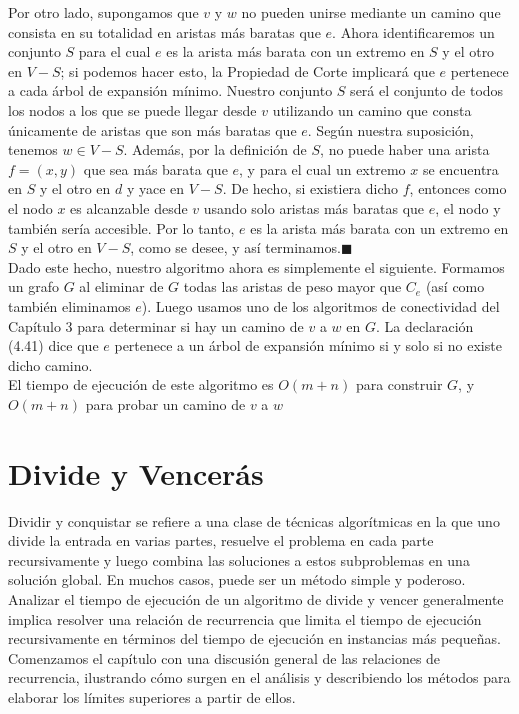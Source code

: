 \documentclass[a4paper, 12pt]{book}
\theoremstyle{dotless}
\begin{document}
Por otro lado, supongamos que $v$ y $w$ no pueden unirse mediante un camino que consista en su totalidad en aristas más baratas que $e$. Ahora identificaremos un conjunto $S$ para el cual $e$ es la arista más barata con un extremo en $S$ y el otro en $V-S$; si podemos hacer esto, la Propiedad de Corte implicará que $e$ pertenece a cada árbol de expansión mínimo. Nuestro conjunto $S$ será el conjunto de todos los nodos a los que se puede llegar desde $v$ utilizando un camino que consta únicamente de aristas que son más baratas que $e$. Según nuestra suposición, tenemos $w \in V-S$. Además, por la definición de $S$, no puede haber una arista $f=(x,y)$ que sea más barata que $e$, y para el cual un extremo $x$ se encuentra en $S$ y el otro en $d$ y yace en $V-S$. De hecho, si existiera dicho $f$, entonces como el nodo $x$ es alcanzable desde $v$ usando solo aristas más baratas que $e$, el nodo y también sería accesible. Por lo tanto, $e$ es la arista más barata con un extremo en $S$ y el otro en $V-S$, como se desee, y así terminamos.$\blacksquare$\\

Dado este hecho, nuestro algoritmo ahora es simplemente el siguiente. Formamos un grafo $G$ al eliminar de $G$ todas las aristas de peso mayor que $C_e$ (así como también eliminamos $e$). Luego usamos uno de los algoritmos de conectividad del Capítulo 3 para determinar si hay un camino de $v$ a $w$ en $G$. La declaración (4.41) dice que $e$ pertenece a un árbol de expansión mínimo si y solo si no existe dicho camino.\\

El tiempo de ejecución de este algoritmo es $O(m+n)$ para construir $G$, y $O(m+n)$ para probar un camino de $v$ a $w$\\


\chapter{Divide y Vencerás}

Dividir y conquistar se refiere a una clase de técnicas algorítmicas en la que uno divide la entrada en varias partes, resuelve el problema en cada parte recursivamente y luego combina las soluciones a estos subproblemas en una solución global. En muchos casos, puede ser un método simple y poderoso.\\

Analizar el tiempo de ejecución de un algoritmo de divide y vencer generalmente implica resolver una relación de recurrencia que limita el tiempo de ejecución recursivamente en términos del tiempo de ejecución en instancias más pequeñas. Comenzamos el capítulo con una discusión general de las relaciones de recurrencia, ilustrando cómo surgen en el análisis y describiendo los métodos para elaborar los límites superiores a partir de ellos.\\
\end{document}
